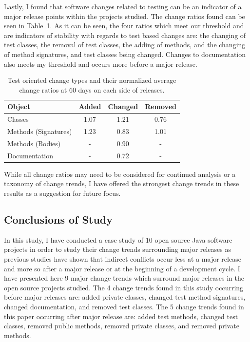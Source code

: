 Lastly, I found that software changes related to testing can be an indicator of a major release points within the projects studied. The change
ratios found can be seen in Table~\ref{tab:test}. As it can be seen, the four ratios which meet our threshold and are indicators of stability with regards to test based
changes are: the changing of test classes, the removal of test classes, the adding of methods, and the changing of method signatures, and test classes being changed.
Changes to documentation also meets my threshold and occurs more before a major release.

\begin{table}[ht]
\begin{center}
\begin{tabular}{| l | c | c | c |}
\hline
Object & Added & Changed & Removed\\
\hline
Classes & 1.07 & 1.21 & 0.76 \\
Methods (Signatures) & 1.23 & 0.83 & 1.01 \\
Methods (Bodies) & - & 0.90 & - \\
Documentation & - & 0.72 & - \\
\hline
\end{tabular}
\end{center}
\caption{Test oriented change types and their normalized average change ratios at 60 days on each side of releases. \label{tab:test}}
\end{table}

While all change ratios may need to be considered for continued analysis or a taxonomy of change trends, I have offered the strongest
change trends in these results as a suggestion for future focus.

\subsection{Conclusions of Study}

In this study, I have conducted a case study of 10 open source Java software projects in order to study their change trends surrounding
major releases as previous studies have shown that indirect conflicts occur less at a major release and more so after a major release
or at the beginning of a development cycle. I have presented here 9 major change trends which surround major releases in the open source
projects studied. The 4 change trends found in this study occurring before major releases are: added private classes, 
changed test method signatures, changed documentation, and removed test classes.
The 5 change trends found in this paper occurring after major release are: added test methods, changed test classes, removed public methods, removed
private classes, and removed private methods.

